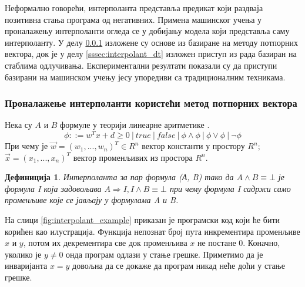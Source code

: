 \documentclass[a4paper]{article}
\newtheorem{definic}{Дефиниција}
\begin{document}
{Неформално говорећи, интерполанта представља предикат који раздваја позитивна стања програма
од негативних. Примена машинског учења у проналажењу интерполанти огледа се у добијању модела
који представља саму интерполанту. У делу \ref{sssec:interpolant_svm} изложене су основе из \cite{Sharma_interpolantsas} базиране на методу
потпорних вектора, док је у делу \ref{sssec:interpolant_dt} изложен приступ из рада \cite{KrishnaPW15} базиран на стаблима одлучивања. Експериментални резултати
показали су да приступи базирани на машинском учењу јесу упоредиви са традиционалним техникама.


\subsubsection{Проналажење интерполанти користећи метод потпорних вектора}
\label{sssec:interpolant_svm}

Нека су $A$ и $B$ формуле у теорији линеарне аритметике \cite{Kroening2008}.
\begin{equation}
\phi ::= w^Tx + d \geq 0 \ | \ true \ | \ false \ | \ \phi \land \phi \ | \ \phi \lor \phi \ | \ \neg \phi
\end{equation}
При чему је $\vec{w} = (w_1, ..., w_n)^T \in R^n$ вектор константи у простору $R^n$; $\vec{x} = (x_1, ..., x_n)^T$
вектор променљивих из простора $R^n$.

\begin{definic}
Интерполанта за пар формула (А, B) тако да $A \land B \equiv \bot$ је формула I која задовољава $A \Rightarrow I, I \land B \equiv \bot$
при чему формула I садржи само променљиве које се јављају у формулама A и B.
\end{definic}

На слици \ref{fig:interpolant_example} приказан је програмски код који ће бити корићен као илустрација.
Функција непознат број пута инкрементира променљиве $x$ и $y$, потом их декрементира све док променљива $x$
не постане 0. Коначно, уколико је $y \neq 0$ онда програм одлази у стање грешке.
Приметимо да је инваријанта $x = y$ довољна да се докаже да програм никад неће доћи у стање грешке.

}
\end{document}
